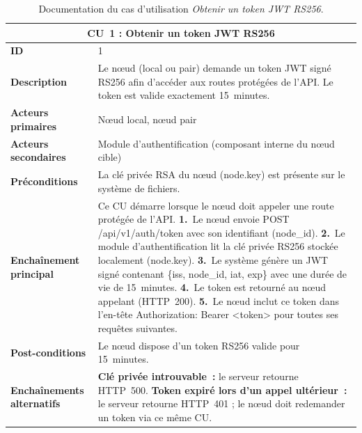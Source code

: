 \begin{table}[H]
\centering
\renewcommand{\arraystretch}{1.5}
\begin{tabular}{|p{3.5cm}|p{10.5cm}|}
\hline
\multicolumn{2}{|c|}{\textbf{CU~1 : Obtenir un token JWT RS256}} \\
\hline
\textbf{ID} & 1 \\
\hline
\textbf{Description} & Le nœud (local ou pair) demande un token JWT signé RS256 afin d'accéder aux routes protégées de l'API. Le token est valide exactement 15~minutes. \\
\hline
\textbf{Acteurs primaires} & Nœud local, nœud pair \\
\hline
\textbf{Acteurs secondaires} & Module d'authentification (composant interne du nœud cible) \\
\hline
\textbf{Préconditions} & La clé privée RSA du nœud ({node.key}) est présente sur le système de fichiers. \\
\hline
\textbf{Enchaînement principal} &
Ce CU démarre lorsque le nœud doit appeler une route protégée de l'API.\newline
\textbf{1.}\ Le nœud envoie {POST /api/v1/auth/token} avec son identifiant ({node\_id}).\newline
\textbf{2.}\ Le module d'authentification lit la clé privée RS256 stockée localement ({node.key}).\newline
\textbf{3.}\ Le système génère un JWT signé contenant {\{iss, node\_id, iat, exp\}} avec une durée de vie de 15~minutes.\newline
\textbf{4.}\ Le token est retourné au nœud appelant (HTTP~200).\newline
\textbf{5.}\ Le nœud inclut ce token dans l'en-tête {Authorization: Bearer <token>} pour toutes ses requêtes suivantes. \\
\hline
\textbf{Post-conditions} & Le nœud dispose d'un token RS256 valide pour 15~minutes. \\
\hline
\textbf{Enchaînements alternatifs} &
\textbf{Clé privée introuvable~:} le serveur retourne HTTP~500.\newline
\textbf{Token expiré lors d'un appel ultérieur~:} le serveur retourne HTTP~401 ; le nœud doit redemander un token via ce même CU. \\
\hline
\end{tabular}
\caption{Documentation du cas d'utilisation \textit{Obtenir un token JWT RS256}.}
\label{tab:cu1}
\end{table}


